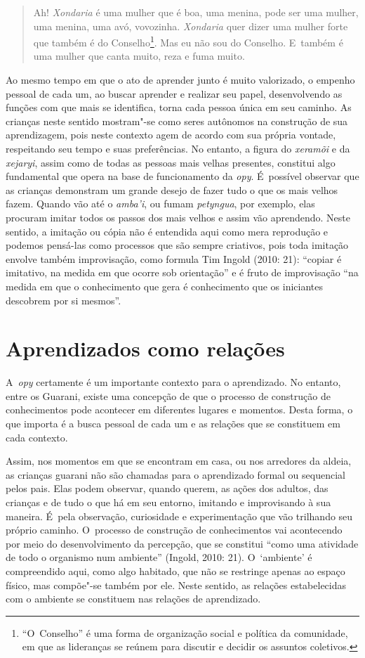\begin{quote}
\noindent
Ah! \emph{Xondaria} é uma mulher que é boa, uma menina, pode ser uma mulher,
uma menina, uma avó, vovozinha. \emph{Xondaria} quer dizer uma mulher forte
que também é do Conselho\footnote{``O~Conselho'' é uma forma de
organização social e política da comunidade, em que as lideranças se
reúnem para discutir e decidir os assuntos coletivos. }. Mas eu não sou
do Conselho. E~também é uma mulher que canta muito, reza e fuma muito.
\end{quote}

Ao mesmo tempo em que o ato de aprender junto é muito valorizado, o
empenho pessoal de cada um, ao buscar aprender e realizar seu papel,
desenvolvendo as funções com que mais se identifica, torna cada pessoa
única em seu caminho. As crianças neste sentido mostram"-se como seres
autônomos na construção de sua aprendizagem, pois neste contexto agem
de acordo com sua própria vontade, respeitando seu tempo e suas
preferências. No entanto, a figura do \emph{xeramõi} e da \emph{xejaryi}, assim como
de todas as pessoas mais velhas presentes, constitui algo fundamental
que opera na base de funcionamento da \emph{opy}. É~possível observar que as
crianças demonstram um grande desejo de fazer tudo o que os mais velhos
fazem. Quando vão até o \emph{amba’i}, ou fumam \emph{petyngua}, por exemplo, elas
procuram imitar todos os passos dos mais velhos e assim vão aprendendo.
Neste sentido, a imitação ou cópia não é entendida aqui como mera
reprodução e podemos pensá-las como processos que são sempre criativos,
pois toda imitação envolve também improvisação, como formula Tim Ingold
(2010: 21): ``copiar é imitativo, na medida em que ocorre sob
orientação'' e é fruto de improvisação ``na medida em que o conhecimento
que gera é conhecimento que os iniciantes descobrem por si mesmos''.

\section{Aprendizados como relações}

A~\emph{opy} certamente é um importante contexto para o aprendizado. No
entanto, entre os Guarani, existe uma concepção de que o processo de
construção de conhecimentos pode acontecer em diferentes lugares e
momentos. Desta forma, o que importa é a busca pessoal de cada um e as
relações que se constituem em cada contexto. 

Assim, nos momentos em que se encontram em casa, ou nos arredores da
aldeia, as crianças guarani não são chamadas para o aprendizado formal
ou sequencial pelos pais. Elas podem observar, quando querem, as ações
dos adultos, das crianças e de tudo o que há em seu entorno, imitando e
improvisando à sua maneira. É~pela observação, curiosidade e
experimentação que vão trilhando seu próprio caminho. O~processo de
construção de conhecimentos vai acontecendo por meio do desenvolvimento
da percepção, que se constitui ``como uma atividade de todo o organismo
num ambiente'' (Ingold, 2010: 21). O~‘ambiente’ é compreendido aqui,
como algo habitado, que não se restringe apenas ao espaço físico, mas
compõe"-se também por ele. Neste sentido, as relações estabelecidas com o
ambiente se constituem nas relações de aprendizado.

